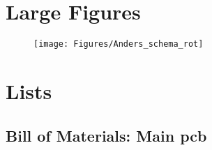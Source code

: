 \section{Large Figures}
	\label{sec:app}

\begin{figure}[H] 
	\centering 
	\texttt{[image: Figures/Anders\_schema\_rot]} 
	\label{fig:anders_koppling} 
\end{figure} 

\clearpage
\section{Lists}
\subsection{Bill of Materials: Main \gls{pcb}}
\begin{comment}
\begin{center}
\begin{tabular}{|l|l|c|}
	\hline
	\bf{Main Board Components} & \bf{Package} & \bf{Quantity} \\
	\hline
	\emph{Capacitors:} & & \\
	\hline
	18p & 0805 & 2 \\
	\hline
	100n & 0805 & 21 \\
	\hline
	1u & 0805 & 2 \\
	\hline 
	2.2u & 0805 & 1 \\
	\hline 
	4.7u & 0805 & 4 \\
	\hline 
	10u & Electrolytic SMD 5x5.3 & 6 \\
	\hline
	\emph{Resistors:} & & \\
	\hline
	220 & 0805 & 1 \\
	\hline
	1k & 0805 & 2 \\
	\hline
	1k & potentiometer & 2 \\
	\hline

\end{tabular}
\end{center}
\end{comment}

